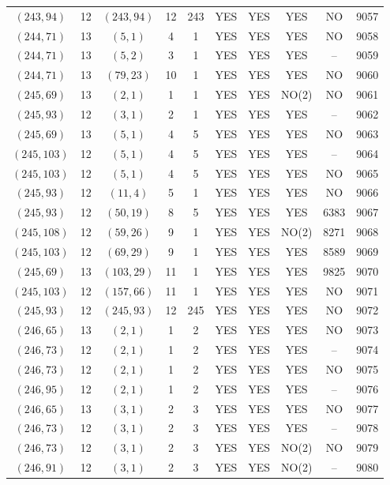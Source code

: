 \begin{longtable}{|c|c|c|c|c|c|c|c|c|c|}
$(243, 94)$ & 12 & $(243, 94)$ & 12 & 243 & YES & YES & YES & NO & 9057\\
$(244, 71)$ & 13 & $(5, 1)$ & 4 & 1 & YES & YES & YES & NO & 9058\\
$(244, 71)$ & 13 & $(5, 2)$ & 3 & 1 & YES & YES & YES & -- & 9059\\
$(244, 71)$ & 13 & $(79, 23)$ & 10 & 1 & YES & YES & YES & NO & 9060\\
$(245, 69)$ & 13 & $(2, 1)$ & 1 & 1 & YES & YES & NO(2) & NO & 9061\\
$(245, 93)$ & 12 & $(3, 1)$ & 2 & 1 & YES & YES & YES & -- & 9062\\
$(245, 69)$ & 13 & $(5, 1)$ & 4 & 5 & YES & YES & YES & NO & 9063\\
$(245, 103)$ & 12 & $(5, 1)$ & 4 & 5 & YES & YES & YES & -- & 9064\\
$(245, 103)$ & 12 & $(5, 1)$ & 4 & 5 & YES & YES & YES & NO & 9065\\
$(245, 93)$ & 12 & $(11, 4)$ & 5 & 1 & YES & YES & YES & NO & 9066\\
$(245, 93)$ & 12 & $(50, 19)$ & 8 & 5 & YES & YES & YES & 6383 & 9067\\
$(245, 108)$ & 12 & $(59, 26)$ & 9 & 1 & YES & YES & NO(2) & 8271 & 9068\\
$(245, 103)$ & 12 & $(69, 29)$ & 9 & 1 & YES & YES & YES & 8589 & 9069\\
$(245, 69)$ & 13 & $(103, 29)$ & 11 & 1 & YES & YES & YES & 9825 & 9070\\
$(245, 103)$ & 12 & $(157, 66)$ & 11 & 1 & YES & YES & YES & NO & 9071\\
$(245, 93)$ & 12 & $(245, 93)$ & 12 & 245 & YES & YES & YES & NO & 9072\\
$(246, 65)$ & 13 & $(2, 1)$ & 1 & 2 & YES & YES & YES & NO & 9073\\
$(246, 73)$ & 12 & $(2, 1)$ & 1 & 2 & YES & YES & YES & -- & 9074\\
$(246, 73)$ & 12 & $(2, 1)$ & 1 & 2 & YES & YES & YES & NO & 9075\\
$(246, 95)$ & 12 & $(2, 1)$ & 1 & 2 & YES & YES & YES & -- & 9076\\
$(246, 65)$ & 13 & $(3, 1)$ & 2 & 3 & YES & YES & YES & NO & 9077\\
$(246, 73)$ & 12 & $(3, 1)$ & 2 & 3 & YES & YES & YES & -- & 9078\\
$(246, 73)$ & 12 & $(3, 1)$ & 2 & 3 & YES & YES & NO(2) & NO & 9079\\
$(246, 91)$ & 12 & $(3, 1)$ & 2 & 3 & YES & YES & NO(2) & -- & 9080\\

\end{longtable}
